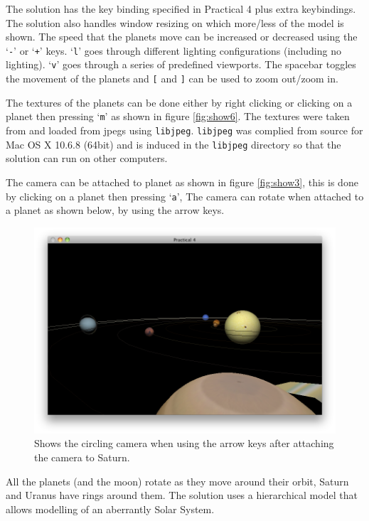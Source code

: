 \clearpage
The solution has the key binding specified in Practical 4  plus extra keybindings. The solution also handles window resizing on which more/less of the model is shown. The speed that the planets move can be increased or decreased using the `\texttt{-}' or `\texttt{+}' keys. `\texttt{l}' goes through different lighting configurations (including no lighting). `\texttt{v}' goes through a series of predefined viewports. The spacebar toggles the movement of the planets and  \texttt{[} and \texttt{]} can be used to zoom out/zoom in.
 
The textures of the planets can be done either by right clicking or clicking on a planet then pressing `\texttt{m}' as shown in figure \ref{fig:show6}. The textures were taken from \cite{pp} and loaded from jpegs using \texttt{libjpeg}. \texttt{libjpeg} was complied from source for Mac OS X 10.6.8 (64bit) and is induced in the \texttt{libjpeg} directory so that the solution can run on other computers.  

The camera can be attached to planet as shown in figure \ref{fig:show3}, this is done by clicking on a planet then pressing `\texttt{a}', The camera can rotate when attached to a planet as shown below, by using the arrow keys. 

	\begin{figure}[htbp]
		\centering
			\includegraphics[scale=0.4]{figures/a.png}
		\caption{Shows the circling camera when using the arrow keys after attaching the camera to Saturn. }
		\label{fig:main}
	\end{figure}

All the planets (and the moon) rotate as they move around their orbit, Saturn and Uranus have rings around them. The solution uses a hierarchical model that allows modelling of an aberrantly Solar System.  

